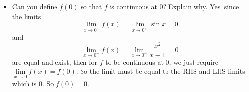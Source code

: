 \documentclass{article}
\begin{document}
\begin{itemize}
        \item Can you define $f(0)$ so that $f$ is continuous at $0$? Explain why. 
            Yes, since the limits
                \begin{equation*}
                    \lim\limits_{x \to 0^{+}} f(x) = \lim\limits_{x \to 0^{+}}\sin{x} = 0
                \end{equation*}
            and
                \begin{equation*}
                    \lim\limits_{x \to 0^{-}}f(x) = \lim\limits_{x \to 0^{-}}\dfrac{x^{2}}{x - 1} = 0
                \end{equation*}
            are equal and exist, then for $f$ to be continuous at $0$, we just require $\lim\limits_{x \to 0}f(x) = f(0)$. So the limit must be equal to the RHS and LHS limits which is $0$. So $f(0) = 0$.
    \end{itemize}
\end{document}
